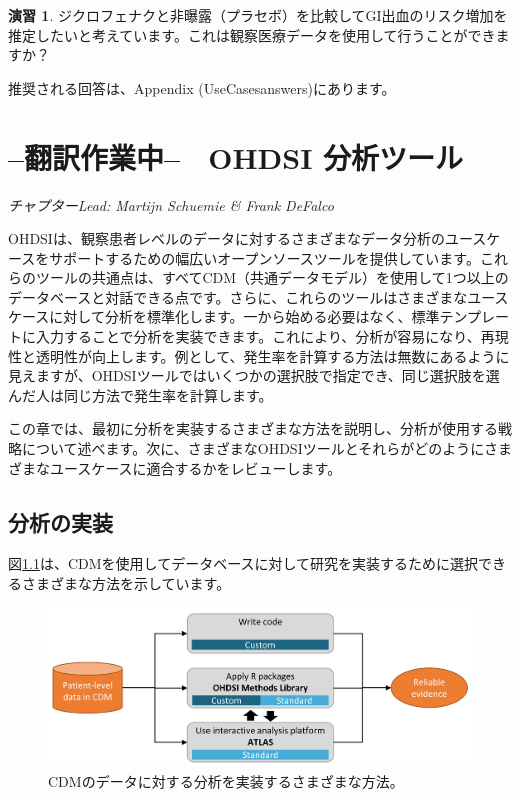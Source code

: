 \documentclass[
  11pt]{book}
\theoremstyle{definition}
\theoremstyle{definition}
\theoremstyle{definition}
\newtheorem{exercise}{演習}[chapter]
\theoremstyle{definition}
\theoremstyle{remark}
\begin{document}
\begin{exercise}
\protect\hypertarget{exr:exerciseUseCases2}{}\label{exr:exerciseUseCases2}ジクロフェナクと非曝露（プラセボ）を比較してGI出血のリスク増加を推定したいと考えています。これは観察医療データを使用して行うことができますか？
\end{exercise}

推奨される回答は、Appendix \citet{ref}(UseCasesanswers)にあります。

\chapter{--翻訳作業中--　OHDSI 分析ツール}\label{OhdsiAnalyticsTools}

\emph{チャプターLead: Martijn Schuemie \& Frank DeFalco}

OHDSIは、観察患者レベルのデータに対するさまざまなデータ分析のユースケースをサポートするための幅広いオープンソースツールを提供しています。これらのツールの共通点は、すべてCDM（共通データモデル）を使用して1つ以上のデータベースと対話できる点です。さらに、これらのツールはさまざまなユースケースに対して分析を標準化します。一から始める必要はなく、標準テンプレートに入力することで分析を実装できます。これにより、分析が容易になり、再現性と透明性が向上します。例として、発生率を計算する方法は無数にあるように見えますが、OHDSIツールではいくつかの選択肢で指定でき、同じ選択肢を選んだ人は同じ方法で発生率を計算します。

この章では、最初に分析を実装するさまざまな方法を説明し、分析が使用する戦略について述べます。次に、さまざまなOHDSIツールとそれらがどのようにさまざまなユースケースに適合するかをレビューします。

\section{分析の実装}\label{analysisImplementation}

図\ref{fig:implementations}は、CDMを使用してデータベースに対して研究を実装するために選択できるさまざまな方法を示しています。 

\begin{figure}

{\centering \includegraphics[width=0.9\linewidth]{images/OhdsiAnalyticsTools/implementations} 

}

\caption{CDMのデータに対する分析を実装するさまざまな方法。}\label{fig:implementations}
\end{figure}
\end{document}
